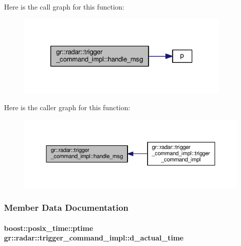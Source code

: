 Here is the call graph for this function\+:
\nopagebreak
\begin{figure}[H]
\begin{center}
\leavevmode
\includegraphics[width=291pt]{db/dbb/classgr_1_1radar_1_1trigger__command__impl_a21d297eb64e978ecada5ecf3fcfc4b4e_cgraph}
\end{center}
\end{figure}




Here is the caller graph for this function\+:
\nopagebreak
\begin{figure}[H]
\begin{center}
\leavevmode
\includegraphics[width=350pt]{db/dbb/classgr_1_1radar_1_1trigger__command__impl_a21d297eb64e978ecada5ecf3fcfc4b4e_icgraph}
\end{center}
\end{figure}




\subsubsection{Member Data Documentation}
\paragraph[{d\+\_\+actual\+\_\+time}]{\setlength{\rightskip}{0pt plus 5cm}boost\+::posix\+\_\+time\+::ptime gr\+::radar\+::trigger\+\_\+command\+\_\+impl\+::d\+\_\+actual\+\_\+time}\label{classgr_1_1radar_1_1trigger__command__impl_a18267027cd99a5a6cfa11a2fb296e15c}


